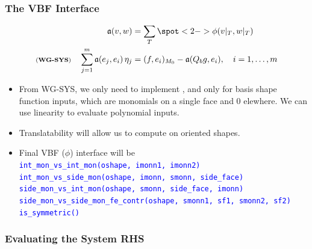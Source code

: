 \documentclass[compress]{beamer}
\begin{document}
\begin{frame}
  \frametitle{The VBF Interface}
  \vspace{-.40cm}
  \begin{align*}
    \mathfrak{a}(v,w) &= \sum_T { \spot<2->{\phi}(v|_T,w|_T) }\\
    \text{\scriptsize (\textbf{WG-SYS})} \quad \sum_{j=1}^m{\mathfrak{a}(e_j, e_i) \,\eta_j} &= (f, e_i)_{M_0} - \mathfrak{a}(Q_b g, e_i),
      \quad i=1,\dots,m
  \end{align*}
  \pause
  \begin{itemize}[<+->]
    \item From {\scriptsize WG-SYS}, we only need to implement , and only for basis shape function inputs,
      which are monomials on a single face and $0$ elewhere. We can use linearity to evaluate polynomial inputs.
    \item Translatability will allow us to compute on oriented shapes.
    \item Final VBF ($\phi$) interface will be\\
    \uncover<+-> {
    \texttt{\small \textcolor{blue}{int\_mon\_vs\_int\_mon(oshape, imonn1, imonn2)}}\\
    \uncover<+-> {
    \texttt{\small \textcolor{blue}{int\_mon\_vs\_side\_mon(oshape, imonn, smonn, side\_face)}}\\
    \uncover<+-> {
    \texttt{\small \textcolor{blue}{side\_mon\_vs\_int\_mon(oshape, smonn, side\_face, imonn)}}\\
    \uncover<+-> {
    \texttt{\small \textcolor{blue}{side\_mon\_vs\_side\_mon\_fe\_contr({\scriptsize oshape, smonn1, sf1, smonn2, sf2})}}\\
    \uncover<+-> {
    \texttt{\small \textcolor{blue}{is\_symmetric() }}
    }}}}}
  \end{itemize}
\end{frame}


\subsubsection{Evaluating the System RHS}
\end{document}
